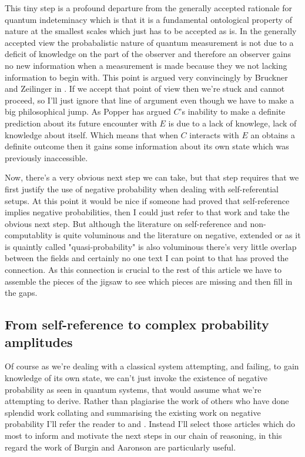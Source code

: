 This tiny step is a profound departure from the generally accepted rationale for quantum
indeteminacy which is that it is a fundamental ontological property of nature at the smallest
scales which just has to be accepted as is. In the generally accepted view the probabalistic
nature of quantum measurement is not due to a deficit of knowledge on the part of the observer
and therefore an observer gains no new information when a measurement is made because they we
not lacking information to begin with. This point is argued very convincingly by Bruckner and
Zeilinger in \autocite{bruknerzeilinger2001shannon}. If we accept that point of view then we're
stuck and cannot proceed, so I'll just ignore that line of argument even though we have to make
a big philosophical jump. As Popper has argued $C$'s inability to make a definite prediction
about its future encounter with $E$ is due to a lack of knowlege, lack of knowledge about
itself. Which means that when $C$ interacts with $E$ an obtains a definite outcome then it gains
some information about its own state which was previously inaccessible.

Now, there's a very obvious next step we can take, but that step requires that we first justify
the use of negative probability when dealing with self-referential setups. At this point it
would be nice if someone had proved that self-reference implies negative probabilities, then I
could just refer to that work and take the obvious next step. But although the literature on
self-reference and non-computablity is quite voluminous and the literature on negative, extended
or as it is quaintly called "quasi-probability" is also voluminous there's very little overlap
between the fields and certainly no one text I can point to that has proved the connection. As
this connection is crucial to the rest of this article we have to assemble the pieces of the
jigsaw to see which pieces are missing and then fill in the gaps.

\subsection{From self-reference to complex probability amplitudes}
\label{sec:self-reference}\label{sec:contextuality} Of course as we're dealing with a classical
system attempting, and failing, to gain knowledge of its own state, we can't just invoke the
existence of negative probability as seen in quantum systems, that would assume what we're
attempting to derive. Rather than plagiarise the work of others who have done splendid work
collating and summarising the existing work on negative probability I'll refer the reader to
\autocite{burgin_2009, burgin2010interpretations} and \autocite{muckenheim_1986}. Instead I'll
select those articles which do most to inform and motivate the next steps in our chain of
reasoning, in this regard the work of Burgin \autocite{burgin2010interpretations} and Aaronson
\autocites{aaronson_lect9}[ch.~9]{Aaronson:dem} are particularly useful.

